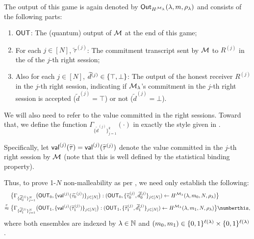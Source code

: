 The output of this game is again denoted by $\mathsf{Out}_{H^{\mathcal{M}_\lambda}}(\lambda, m, \rho_\lambda)$ and consists of the following parts:
\begin{enumerate}
\item
$\mathsf{OUT}$: The (quantum) output of $\mathcal{M}$ at the end of this game;
\item For each $j \in [N]$, 
$\tilde{\tau}^{(j)}$: The commitment transcript sent by $\mathcal{M}$ to $R^{(j)}$ in the  of the $j$-th right session; 
\item Also for each $j \in [N]$, 
$\widetilde{d}^{(j)} \in \{\top, \bot\}$: The output of the honest receiver $R^{(j)}$ in the $j$-th right session, indicating if $\mathcal{M}_\lambda$'s commitment in the $j$-th right session is accepted ($\tilde{d}^{(j)} = \top$) or not ($\tilde{d}^{(j)} = \bot$).
\end{enumerate} 


We will also need to refer to the value committed in the right sessions. Toward that, we define the function $\Gamma_{\{\tilde{d}^{(j)}\}_{j=1}^{k}}(\cdot)$ in exactly the style given in .



Specifically, let $\mathsf{val}^{(j)}(\widetilde{\tau}) = \mathsf{val}^{(j)}(\widetilde{\tau}^{(j)})$ denote the value committed in the $j$-th right session by $\mathcal{M}$ (note that this is well defined by the statistical binding property). 

Thus, to prove 1-$N$ non-malleability as per , we need only establish the following:
\begin{align*}
&\big\{\Gamma_{\{\tilde{d}_0^{(j)}\}_{j=1}^{N}}\big(\OUT_0, \Set{\msf{val}^{(j)}(\tilde{\tau_0}^{(j)})}_{j \in [N]}\big): (\OUT_0, \Set{\tilde{\tau}^{(j)}_0, \tilde{d}^{(j)}_0}_{j \in [N]}) \gets H^{\mcal{M}_\secpar}(\secpar,m_0, N, \rho_\secpar) \big\} \\
\cind ~& 
\big\{\Gamma_{\{\tilde{d}_1^{(j)}\}_{j=1}^{N}}\big(\OUT_1, \Set{\msf{val}^{(j)}(\tilde{\tau}_1^{(j)})}_{j \in [N]}\big): (\OUT_1, \Set{\tilde{\tau}^{(j)}_1, \tilde{d}^{(j)}_1}_{j \in [N]}) \gets H^{\mcal{M}_\secpar}(\secpar, m_1, N, \rho_\secpar) \big\} \numberthis \label{pq:eq:classical:1-many:H:m-0:m-1},
\end{align*}
where both ensembles are indexed by $\lambda \in \mathbb{N}$ and $(m_0, m_1) \in \{0,1\}^{\ell(\lambda)} \times \{0,1\}^{\ell(\lambda)}$.

